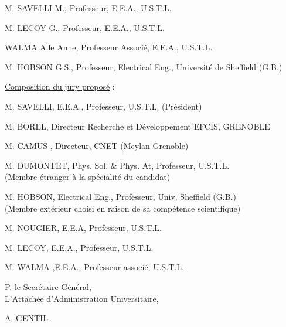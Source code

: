 M. SAVELLI M., Professeur, E.E.A., U.S.T.L.

M. LECOY G., Professeur, E.E.A., U.S.T.L.

 WALMA Alle Anne, Professeur Associé, E.E.A., U.S.T.L.

M. HOBSON G.S., Professeur, Electrical Eng., Université de Sheffield (G.B.)

\uline{Composition du jury proposé} :

M. SAVELLI, E.E.A., Professeur, U.S.T.L.  (Président)

M. BOREL, Directeur Recherche et Développement EFCIS, GRENOBLE

M. CAMUS , Directeur, CNET (Meylan-Grenoble)

M. DUMONTET, Phys. Sol. \& Phys. At, Professeur, U.S.T.L.\\
(Membre étranger à la spécialité du candidat)

M. HOBSON, Electrical Eng., Professeur, Univ. Sheffield (G.B.)\\
(Membre extérieur choisi en raison de sa compétence scientifique)

M. NOUGIER, E.E.A, Professeur, U.S.T.L.

M. LECOY, E.E.A., Professeur, U.S.T.L.

M. WALMA ,E.E.A., Professeur associé, U.S.T.L.

P. le Secrétaire Général,\\
L'Attachée d'Administration Universitaire,


\uline{A. GENTIL}

